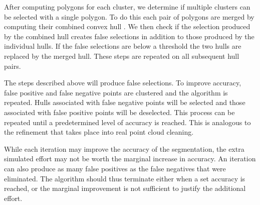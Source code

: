After computing polygons for each cluster, we determine if multiple clusters can be selected with a single polygon. To do this each pair of polygons are merged by computing their combined convex hull \cite{Andrew1979}. We then check if the selection produced by the combined hull creates false selections in addition to those produced by the individual hulls. If the false selections are below a threshold the two hulls are replaced by the merged hull. These steps are repeated on all subsequent hull pairs. 

The steps described above will produce false selections. To improve accuracy, false positive and false negative points are clustered and the algorithm is repeated. Hulls associated with false negative points will be selected and those associated with false positive points will be deselected. This process can be repeated until a predetermined level of accuracy is reached. This is analogous to the refinement that takes place into real point cloud cleaning.

While each iteration may improve the accuracy of the segmentation, the extra simulated effort may not be worth the marginal increase in accuracy. An iteration can also produce as many false positives as the false negatives that were eliminated. The algorithm should thus terminate either when a set accuracy is reached, or the marginal improvement is not sufficient to justify the additional effort.


